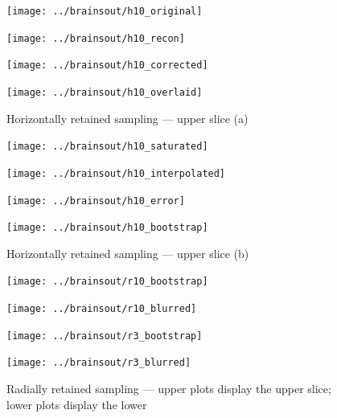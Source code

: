 \documentclass[article]{jdssv}
\begin{document}
\begin{figure}
\begin{centering}

\parbox{\imsizes}{\texttt{[image: ../brainsout/h10\_original]}}
\hfill
\parbox{\imsizes}{\texttt{[image: ../brainsout/h10\_recon]}}

\vspace{\vertsep}

\parbox{\imsizes}{\texttt{[image: ../brainsout/h10\_corrected]}}
\hfill
\parbox{\imsizes}{\texttt{[image: ../brainsout/h10\_overlaid]}}

\end{centering}
\caption{Horizontally retained sampling --- upper slice (a)}
\end{figure}


\begin{figure}
\begin{centering}

\parbox{\imsizes}{\texttt{[image: ../brainsout/h10\_saturated]}}
\hfill
\parbox{\imsizes}{\texttt{[image: ../brainsout/h10\_interpolated]}}

\vspace{\vertsep}

\parbox{\imsizes}{\texttt{[image: ../brainsout/h10\_error]}}
\hfill
\parbox{\imsizes}{\texttt{[image: ../brainsout/h10\_bootstrap]}}

\end{centering}
\caption{Horizontally retained sampling --- upper slice (b)}
\label{last_viz}
\end{figure}


\begin{figure}
\begin{centering}

\parbox{\imsizes}{\texttt{[image: ../brainsout/r10\_bootstrap]}}
\hfill
\parbox{\imsizes}{\texttt{[image: ../brainsout/r10\_blurred]}}

\vspace{\vertsep}

\parbox{\imsizes}{\texttt{[image: ../brainsout/r3\_bootstrap]}}
\hfill
\parbox{\imsizes}{\texttt{[image: ../brainsout/r3\_blurred]}}

\end{centering}
\caption{Radially retained sampling
--- upper plots display the upper slice; lower plots display the lower}
\label{blurredr}
\end{figure}
\end{document}
